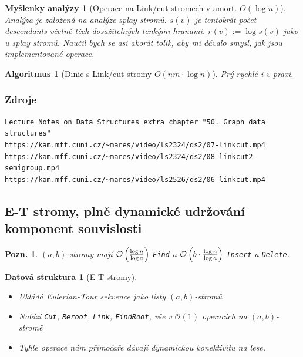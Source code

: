 \documentclass{article}
\theoremstyle{noparens}
\newtheorem*{alg}{Algoritmus}
\newtheorem*{ds}{Datová struktura}
\theoremstyle{noparens-mys}
\newtheorem*{anal-mys}{Myšlenky analýzy}
\theoremstyle{noparens-note}
\newtheorem*{note}{Pozn.}
\newcommand{\OO}{\mathcal{O}}
\begin{document}
\begin{anal-mys}[Operace na Link/cut stromech v amort. $O(\log n)$]
    Analýza je založená na analýze splay stromů.  $s(v)$ je tentokrát počet
    descendants včetně těch dosažitelných tenkými hranami.  $r(v) := \log s(v)$
    jako u splay stromů. Naučil bych se asi akorát tolik, aby mi dávalo smysl,
    jak jsou implementované operace.
\end{anal-mys}

\begin{alg}[Dinic s Link/cut stromy $O(nm \cdot \log n)$]
    Prý rychlé i v praxi.
\end{alg}

\subsubsection*{Zdroje}

\begin{verbatim}
Lecture Notes on Data Structures extra chapter "50. Graph data structures"
https://kam.mff.cuni.cz/~mares/video/ls2324/ds2/07-linkcut.mp4
https://kam.mff.cuni.cz/~mares/video/ls2324/ds2/08-linkcut2-semigroup.mp4
https://kam.mff.cuni.cz/~mares/video/ls2526/ds2/06-linkcut.mp4
\end{verbatim}


\subsection{E-T stromy, plně dynamické udržování komponent souvislosti}

\begin{note}
    $(a,b)$-stromy mají $\OO\left({{\log n} \over {\log a}}\right)$
    \texttt{Find} a $\OO\left(b \cdot {{\log n} \over {\log a}}\right)$
    \texttt{Insert} a \texttt{Delete}.
\end{note}

\begin{ds}[E-T stromy]
    ~

    \begin{itemize}
        \item Ukládá Eulerian-Tour sekvence jako listy $(a,b)$-stromů
        \item Nabízí \texttt{Cut}, \texttt{Reroot}, \texttt{Link},
            \texttt{FindRoot}, vše v $\OO(1)$ operacích na $(a,b)$-stromě
        \item Tyhle operace nám přímočaře dávají dynamickou konektivitu na
            lese.
    \end{itemize}
\end{ds}
\end{document}
